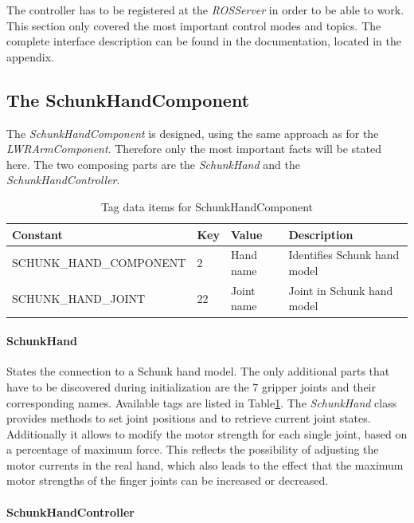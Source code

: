 The controller has to be registered at the \emph{ROSServer} in order to be able to work. This section only covered the most important control modes and topics. The complete interface description can be found in the documentation, located in the appendix.

\subsection{The SchunkHandComponent}

The \emph{SchunkHandComponent} is designed, using the same approach as for the \emph{LWRArmComponent}. Therefore only the most important facts will be stated here. The two composing parts are the \emph{SchunkHand} and the \emph{SchunkHandController}.
\begin{table}[h]
  \centering
  \label{fig:schunk_tags}
  \begin{tabularx}{\textwidth}{|l|l|l|X|} \hline
	\textbf{Constant} & \textbf{Key} & \textbf{Value} & \textbf{Description} \\ \hline
	SCHUNK\_HAND\_COMPONENT & 2 & Hand name & Identifies Schunk hand model \\
	SCHUNK\_HAND\_JOINT & 22 & Joint name & Joint in Schunk hand model \\ \hline
  \end{tabularx}
  \caption{Tag data items for SchunkHandComponent}
\end{table}

\paragraph{SchunkHand}

States the connection to a Schunk hand model. The only additional parts that have to be discovered during initialization are the 7 gripper joints and their corresponding names. Available tags are
listed in Table\ref{fig:schunk_tags}. The \emph{SchunkHand} class provides methods to set joint positions and to retrieve current joint states. Additionally it allows to modify the motor strength for each single joint, based on a percentage of maximum force. This reflects the possibility of adjusting the motor currents in the real hand, which also leads to the effect that the maximum motor strengths of the finger joints can be increased or decreased.

\paragraph{SchunkHandController}

